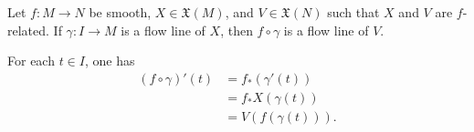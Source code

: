 \documentclass{ximera}
\begin{document}
    \begin{proposition}
        Let $f: M \to N$ be smooth, $X \in \mathfrak{X}(M)$, and $V \in \mathfrak{X}(N)$ such that $X$ and $V$ are $f$-related. If $\gamma : I \to M$ is a flow line of $X$, then $f\circ \gamma $ is a flow line of $V$.

    \begin{solution}
        For each $t \in I$, one has
        \begin{align*}
            (f \circ \gamma )' (t) & = f_{\ast} ( \gamma ' (t) ) \\
            & = f_{\ast} X(\gamma (t)) \\
            & = V (f (\gamma (t ))) .
        \end{align*}
    \end{solution}
    \end{proposition}
\end{document}
